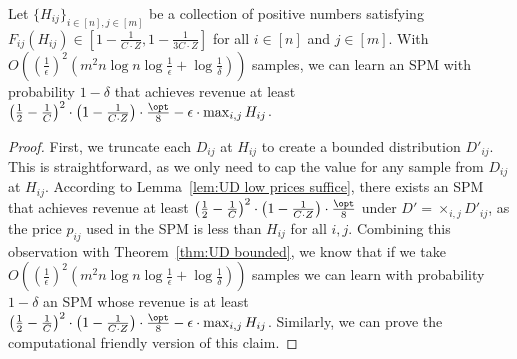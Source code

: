 {\begin{lemma}\label{lem:UD additive bound}
	Let $\{H_{ij}\}_{i\in[n],j\in[m]}$ be a collection of positive numbers satisfying $F_{ij}(H_{ij})\in [1-\frac{1}{C\cdot Z}, 1-\frac{1}{3C\cdot Z}]$ for all $i\in[n]$ and $j\in[m]$. With $O\left(\left(\frac{1}{\epsilon}\right)^2 \left(m^2 n\log n\log \frac{1}{\epsilon} + \log \frac{1}{\delta}\right)\right)$ samples, we can learn an SPM with probability $1-\delta$ that achieves revenue at least $\left(\frac{1}{2}-\frac{1}{C}\right)^2\cdot \left(1-\frac{1}{C\cdot Z}\right)\cdot \frac{\opt}{8}-\epsilon\cdot\max_{i,j} H_{ij}$. 
\end{lemma}
\begin{proof}
	First, we truncate each $D_{ij}$ at $H_{ij}$ to create a bounded distribution $D'_{ij}$. This is straightforward, as we only need to cap the value for any sample from $D_{ij}$ at $H_{ij}$. According to Lemma~\ref{lem:UD low prices suffice}, there exists an SPM that achieves revenue at least $\left(\frac{1}{2}-\frac{1}{C}\right)^2\cdot \left(1-\frac{1}{C\cdot Z}\right)\cdot \frac{\opt}{8}$ under $D'=\times_{i,j} D'_{ij}$, as the price $p_{ij}$ used in the SPM is less than $H_{ij}$ for all $i,j$. Combining this observation with Theorem~\ref{thm:UD bounded}, we know that if we take $O\left(\left(\frac{1}{\epsilon}\right)^2 \left(m^2 n\log n\log \frac{1}{\epsilon} + \log \frac{1}{\delta}\right)\right)$ samples we can learn with probability $1-\delta$ an SPM whose revenue is at least $\left(\frac{1}{2}-\frac{1}{C}\right)^2\cdot \left(1-\frac{1}{C\cdot Z}\right)\cdot \frac{\opt}{8}-\epsilon\cdot\max_{i,j} H_{ij}$. Similarly, we can prove the computational friendly version of this claim. \end{proof}}
	

